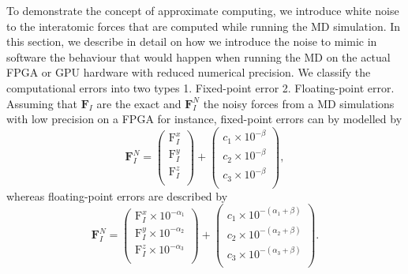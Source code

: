 To demonstrate the concept of approximate computing, we introduce white noise to the interatomic forces that are computed while running the MD simulation. In this section, we describe in detail on how we introduce the noise to mimic in software the behaviour that would happen when running the MD on the actual FPGA or GPU hardware with reduced numerical precision. We classify the computational errors into two types 1. Fixed-point error 2. Floating-point error. Assuming that $\textbf{F}_{I}$ are the exact and $\textbf{F}_{I}^{N}$ the noisy forces from a MD simulations with low precision on a FPGA for instance, fixed-point errors can by modelled by 
\begin{equation}
\textbf{F}_{I}^{N}=
\begin{pmatrix}
\text{F}_{I}^{x}\\ 
\text{F}_{I}^{y}\\ 
\text{F}_{I}^{z}\\ 
\end{pmatrix} + 
\begin{pmatrix}
c_{1} \times 10^{-\beta }\\ 
c_{2} \times 10^{-\beta }\\ 
c_{3} \times 10^{-\beta }\\ 
\end{pmatrix}
,
\end{equation}
whereas floating-point errors are described by
\begin{equation}
\textbf{F}_{I}^{N} = 
\begin{pmatrix}
\text{F}_{I}^{x} \times 10^{-\alpha_1}\\ 
\text{F}_{I}^{y} \times 10^{-\alpha_2}\\ 
\text{F}_{I}^{z} \times 10^{-\alpha_3}\\ 
\end{pmatrix} + 
\begin{pmatrix}
c_{1} \times 10^{-(\alpha_1+\beta)}\\ 
c_{2} \times 10^{-(\alpha_2+\beta)}\\ 
c_{3} \times 10^{-(\alpha_3+\beta)}\\ 
\end{pmatrix}
.
\end{equation}
